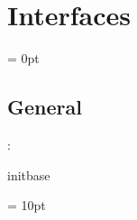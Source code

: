
\section{Interfaces} 


\parskip = 0pt

\vspace{3mm} \subsection*{General}

: 

initbase
\vspace{2mm}

\vspace{5mm}\parskip = 10pt 
